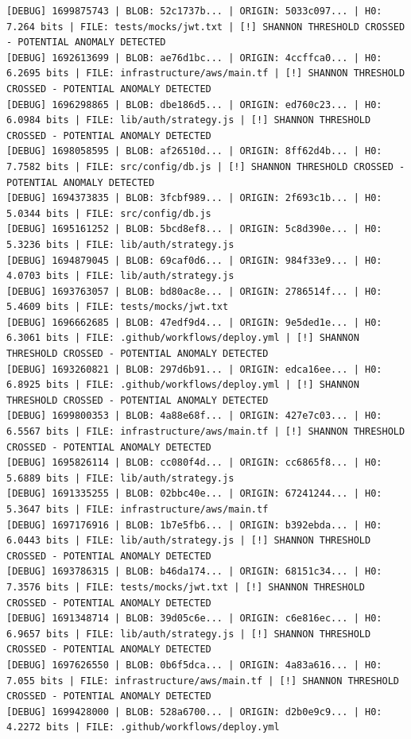 \documentclass[12pt, a4paper, oneside]{report}
\begin{document}
\begin{lstlisting}[basicstyle=\tiny\ttfamily]
[DEBUG] 1699875743 | BLOB: 52c1737b... | ORIGIN: 5033c097... | H0: 7.264 bits | FILE: tests/mocks/jwt.txt | [!] SHANNON THRESHOLD CROSSED - POTENTIAL ANOMALY DETECTED
[DEBUG] 1692613699 | BLOB: ae76d1bc... | ORIGIN: 4ccffca0... | H0: 6.2695 bits | FILE: infrastructure/aws/main.tf | [!] SHANNON THRESHOLD CROSSED - POTENTIAL ANOMALY DETECTED
[DEBUG] 1696298865 | BLOB: dbe186d5... | ORIGIN: ed760c23... | H0: 6.0984 bits | FILE: lib/auth/strategy.js | [!] SHANNON THRESHOLD CROSSED - POTENTIAL ANOMALY DETECTED
[DEBUG] 1698058595 | BLOB: af26510d... | ORIGIN: 8ff62d4b... | H0: 7.7582 bits | FILE: src/config/db.js | [!] SHANNON THRESHOLD CROSSED - POTENTIAL ANOMALY DETECTED
[DEBUG] 1694373835 | BLOB: 3fcbf989... | ORIGIN: 2f693c1b... | H0: 5.0344 bits | FILE: src/config/db.js
[DEBUG] 1695161252 | BLOB: 5bcd8ef8... | ORIGIN: 5c8d390e... | H0: 5.3236 bits | FILE: lib/auth/strategy.js
[DEBUG] 1694879045 | BLOB: 69caf0d6... | ORIGIN: 984f33e9... | H0: 4.0703 bits | FILE: lib/auth/strategy.js
[DEBUG] 1693763057 | BLOB: bd80ac8e... | ORIGIN: 2786514f... | H0: 5.4609 bits | FILE: tests/mocks/jwt.txt
[DEBUG] 1696662685 | BLOB: 47edf9d4... | ORIGIN: 9e5ded1e... | H0: 6.3061 bits | FILE: .github/workflows/deploy.yml | [!] SHANNON THRESHOLD CROSSED - POTENTIAL ANOMALY DETECTED
[DEBUG] 1693260821 | BLOB: 297d6b91... | ORIGIN: edca16ee... | H0: 6.8925 bits | FILE: .github/workflows/deploy.yml | [!] SHANNON THRESHOLD CROSSED - POTENTIAL ANOMALY DETECTED
[DEBUG] 1699800353 | BLOB: 4a88e68f... | ORIGIN: 427e7c03... | H0: 6.5567 bits | FILE: infrastructure/aws/main.tf | [!] SHANNON THRESHOLD CROSSED - POTENTIAL ANOMALY DETECTED
[DEBUG] 1695826114 | BLOB: cc080f4d... | ORIGIN: cc6865f8... | H0: 5.6889 bits | FILE: lib/auth/strategy.js
[DEBUG] 1691335255 | BLOB: 02bbc40e... | ORIGIN: 67241244... | H0: 5.3647 bits | FILE: infrastructure/aws/main.tf
[DEBUG] 1697176916 | BLOB: 1b7e5fb6... | ORIGIN: b392ebda... | H0: 6.0443 bits | FILE: lib/auth/strategy.js | [!] SHANNON THRESHOLD CROSSED - POTENTIAL ANOMALY DETECTED
[DEBUG] 1693786315 | BLOB: b46da174... | ORIGIN: 68151c34... | H0: 7.3576 bits | FILE: tests/mocks/jwt.txt | [!] SHANNON THRESHOLD CROSSED - POTENTIAL ANOMALY DETECTED
[DEBUG] 1691348714 | BLOB: 39d05c6e... | ORIGIN: c6e816ec... | H0: 6.9657 bits | FILE: lib/auth/strategy.js | [!] SHANNON THRESHOLD CROSSED - POTENTIAL ANOMALY DETECTED
[DEBUG] 1697626550 | BLOB: 0b6f5dca... | ORIGIN: 4a83a616... | H0: 7.055 bits | FILE: infrastructure/aws/main.tf | [!] SHANNON THRESHOLD CROSSED - POTENTIAL ANOMALY DETECTED
[DEBUG] 1699428000 | BLOB: 528a6700... | ORIGIN: d2b0e9c9... | H0: 4.2272 bits | FILE: .github/workflows/deploy.yml

\end{lstlisting}
\end{document}
